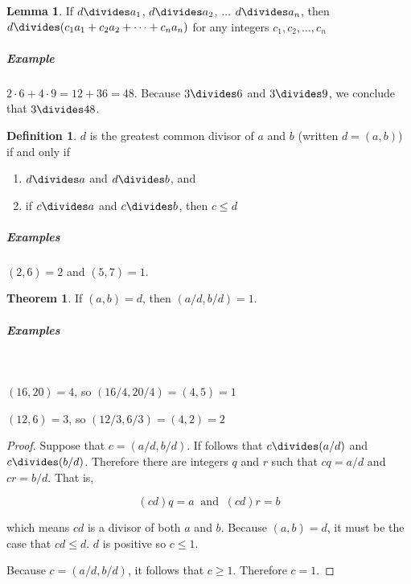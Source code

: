 \documentclass{article}
\theoremstyle{definition} %
\newtheorem{theorem}{Theorem}[section] %
\theoremstyle{definition}
\theoremstyle{definition}
\newtheorem{lemma}{Lemma}[section]
\theoremstyle{definition}
\newtheorem{definition}{Definition}[section]
\begin{document}
  \begin{lemma}
    If $d \divides a_1$, $d \divides a_2$, $\dots$ $d \divides a_n$, then $d \divides (c_1a_1 + c_2a_2 + \dots + c_na_n)$ for any integers $c_1, c_2, \dots, c_n$
  \end{lemma}
  
  \subparagraph{Example} $2 \cdot 6 + 4 \cdot 9 = 12 + 36 = 48$. Because $3 \divides 6$ and $3 \divides 9$, we conclude that $3 \divides 48$.
  
  \begin{definition}
    $d$ is the greatest common divisor of $a$ and $b$ (written $d = (a, b)$) if and only if
    
    \begin{enumerate}[label=(\roman*)]
      \item $d \divides a$ and $d \divides b$, and
    
      \item if $c \divides a$ and $c \divides b$, then $c \le d$
    \end{enumerate}
  \end{definition}
  
  \subparagraph{Examples} $(2, 6) = 2$ and $(5, 7) = 1$.
  
  \begin{theorem}
    If $(a, b) = d$, then $(a / d, b / d) = 1$.
  \end{theorem}
  
  \subparagraph{Examples} \ 
  
  $(16, 20) = 4$, so $(16 / 4, 20 / 4) = (4, 5) = 1$
  
  $(12, 6) = 3$, so $(12 / 3, 6 / 3) = (4, 2) = 2$
  
  \begin{proof}
    Suppose that $c = (a / d, b / d)$. If follows that $c \divides (a / d)$ and $c \divides (b / d)$. Therefore there are
    integers $q$ and $r$ such that $cq = a / d$ and $cr = b / d$. That is,
    
      \begin{equation*}
        (cd)q = a \;\;\text{and}\;\; (cd)r = b
      \end{equation*}
    
    which means $cd$ is a divisor of both $a$ and $b$. Because $(a, b) = d$, it must be the case that $cd \leq d$.
    $d$ is positive so $c \leq 1$.
    
    Because $c = (a / d, b / d)$, it follows that $c \geq 1$. Therefore $c = 1$.
  \end{proof}
  
\end{document}
